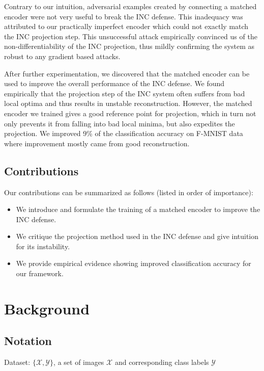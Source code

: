 \documentclass{article}
\theoremstyle{definition}
\begin{document}
Contrary to our intuition, adversarial examples created by connecting a matched encoder were not very useful to break the INC defense. This inadequacy was attributed to our practically imperfect encoder which could not exactly match the INC projection step. This unsuccessful attack empirically convinced us of the non-differentiability of the INC projection, thus mildly confirming the system as robust to any gradient based attacks.

After further experimentation, we discovered that the matched encoder can be used to improve the overall performance of the INC defense. We found empirically that the projection step of the INC system often suffers from bad local optima and thus results in unstable reconstruction. However, the matched encoder we trained gives a good reference point for projection, which in turn not only prevents it from falling into bad local minima, but also expedites the projection. We improved 9\% of the classification accuracy on F-MNIST data where improvement mostly came from good reconstruction. 




\subsection{Contributions}
Our contributions can be summarized as follows (listed in order of importance):
\begin{itemize}
    \item We introduce and formulate the training of a matched encoder to improve the INC defense.
    \item We critique the projection method used in the INC defense and give intuition for its instability.
    \item We provide empirical evidence showing improved classification accuracy for our framework.
\end{itemize}

\section{Background}

\subsection{Notation}

Dataset: $\{\mathcal{X},\mathcal{Y}\}$, a set of images $\mathcal{X}$ and corresponding
class labels $\mathcal{Y}$
\end{document}
